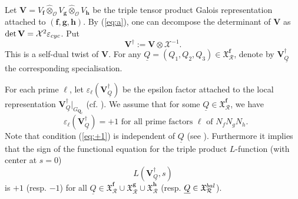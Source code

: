 \documentclass[10pt,letterpaper]{amsart}
\theoremstyle{plain}
\theoremstyle{definition}
\theoremstyle{definition}
\theoremstyle{plain}
\theoremstyle{plain}
\theoremstyle{plain}
\theoremstyle{remark}
\numberwithin{equation}{section}
\def\cO{\mathcal O}
\newcommand{\VQdag}{{\mathbf{V}_{\underline{Q}}^\dagger}}
\newcommand{\Vdag}{{\mathbf{V}^\dagger}}
\newcommand{\Q}{\mathbf{Q}}
\newcommand{\bff}{{\boldsymbol{f}}}
\newcommand{\bfg}{{\boldsymbol{g}}}
\newcommand{\bfh}{{\boldsymbol{h}}}
\begin{document}
Let $\mathbf{V}=V_\bff\hat\otimes_{\cO}V_{\bfg}\hat\otimes_{\cO}V_{\bfh}$ be the triple tensor product Galois representation attached to $(\bff,\bfg,\bfh)$. By (\ref{eq:a}), one can decompose the determinant of $\mathbf{V}$ as $\det\mathbf{V}=\mathcal{X}^2\varepsilon_{\rm cyc}$. Put  
\begin{equation}\label{eqn:V-dagger}
\Vdag:=\mathbf{V}\otimes\mathcal{X}^{-1}.
\end{equation}
This is a self-dual twist of $\mathbf{V}$. For any $\underline{Q}=(Q_1,Q_2,Q_3)\in\mathfrak{X}_{\mathcal{R}}^\bff$,  denote by $\VQdag$  the corresponding specialisation. 

For each prime $\ell$, let $\varepsilon_\ell(\VQdag)$ be the epsilon factor attached to the local representation $\VQdag\vert_{G_{\Q_\ell}}$  
(cf. \cite[p.\,21]{tate-background}). We assume that for some $\underline{Q}\in\mathfrak{X}_{\mathcal{R}}^\bff$, we have
\begin{equation}\label{eq:+1}
\textrm{ $\varepsilon_\ell(\VQdag)=+1$ for all prime factors $\ell$ of $N_f N_g N_h$.}
\end{equation}
Note that condition (\ref{eq:+1}) is independent of $\underline{Q}$ (see \cite[\S{1.2}]{hsieh-triple}). Furthermore it implies that the sign of the functional equation for the triple product $L$-function (with center at $s=0$) 
\[
L(\VQdag,s)
\] 
is $+1$ (resp. $-1$) for all $\underline{Q}\in\mathfrak{X}_{\mathcal{R}}^\bff\cup\mathfrak{X}_{\mathcal{R}}^\bfg\cup\mathfrak{X}_{\mathcal{R}}^\bfh$ (resp. $\underline{Q}\in\mathfrak{X}_{\mathcal{R}}^{\rm bal}$). 
\end{document}
